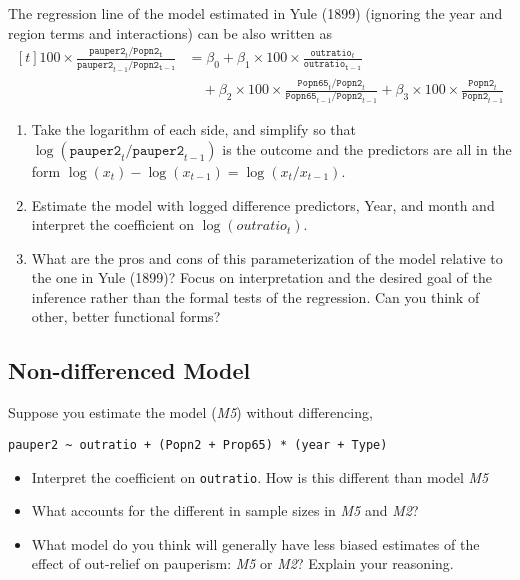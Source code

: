 \documentclass[]{article}
\providecommand{\tightlist}{%
  \setlength{\itemsep}{0pt}\setlength{\parskip}{0pt}}
\begin{document}
The regression line of the model estimated in Yule (1899) (ignoring the
year and region terms and interactions) can be also written as \[
\begin{aligned}[t]
100 \times \frac{\mathtt{pauper2}_t / \mathtt{Popn2_t}}{\mathtt{pauper2}_{t-1} / \mathtt{Popn2_{t-1}}} 
&= \beta_0 + \beta_1 \times 100 \times \frac{\mathtt{outratio}_t}{\mathtt{outratio_{t-1}}} \\
& \quad + \beta_2 \times 100 \times \frac{\mathtt{Popn65}_t / \mathtt{Popn2}_{t}}{\mathtt{Popn65}_{t-1} / \mathtt{Popn2}_{t-1}} + \beta_3 \times 100 \times \frac{\mathtt{Popn2}_t}{\mathtt{Popn2}_{t - 1}}
\end{aligned}
\]

\begin{enumerate}
\def\labelenumi{\arabic{enumi}.}
\tightlist
\item
  Take the logarithm of each side, and simplify so that
  \(\log(\mathtt{pauper2}_t/\mathtt{pauper2}_{t -1})\) is the outcome
  and the predictors are all in the form
  \(\log(x_t) - \log(x_{t - 1}) = \log(x_t / x_{t - 1})\).
\item
  Estimate the model with logged difference predictors, Year, and month
  and interpret the coefficient on \(\log(outratio_t)\).
\item
  What are the pros and cons of this parameterization of the model
  relative to the one in Yule (1899)? Focus on interpretation and the
  desired goal of the inference rather than the formal tests of the
  regression. Can you think of other, better functional forms?
\end{enumerate}

\subsection{Non-differenced Model}\label{non-differenced-model}

Suppose you estimate the model (\emph{M5}) without differencing,

\begin{verbatim}
pauper2 ~ outratio + (Popn2 + Prop65) * (year + Type)
\end{verbatim}

\begin{itemize}
\tightlist
\item
  Interpret the coefficient on \texttt{outratio}. How is this different
  than model \emph{M5}
\item
  What accounts for the different in sample sizes in \emph{M5} and
  \emph{M2}?
\item
  What model do you think will generally have less biased estimates of
  the effect of out-relief on pauperism: \emph{M5} or \emph{M2}? Explain
  your reasoning.
\end{itemize}
\end{document}
